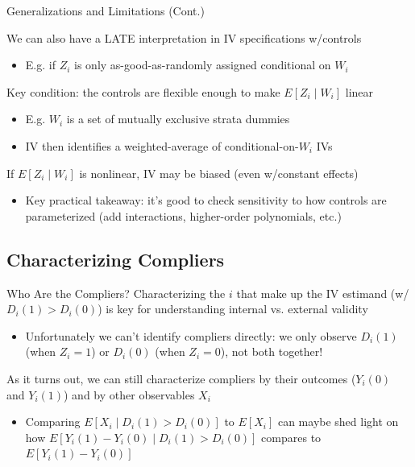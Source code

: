 \documentclass{beamer}
\begin{document}
\begin{frame}{Generalizations and Limitations (Cont.)}

We can also have a LATE interpretation in IV specifications w/controls
\begin{itemize}
\item E.g. if $Z_i$ is only as-good-as-randomly assigned conditional on $W_i$
\end{itemize}\medskip\pause{}

Key condition: the controls are flexible enough to make $E[Z_i\mid W_i]$ linear
\vspace{-0.7cm}
\begin{itemize}
\item E.g. $W_i$ is a set of mutually exclusive strata dummies
\item IV then identifies a weighted-average of conditional-on-$W_i$ IVs
\end{itemize}\medskip\pause{}

If $E[Z_i\mid W_i]$ is nonlinear, IV may be biased (even w/constant effects)
\begin{itemize}
\item Key practical takeaway: it's good to check sensitivity to how controls are parameterized (add interactions, higher-order polynomials, etc.)
\end{itemize}
\end{frame}

\subsection{Characterizing Compliers}

\begin{frame}{Who Are the Compliers?}
Characterizing the $i$ that make up the IV estimand (w/$D_i(1)>D_i(0)$) is key for understanding internal vs. external validity \smallskip
\begin{itemize}
\item Unfortunately we can't identify compliers directly: we only observe $D_i(1)$ (when $Z_i=1$) or $D_i(0)$ (when $Z_i=0$), not both together!
\end{itemize}\bigskip\pause{}
As it turns out, we can still characterize compliers by their outcomes ($Y_i(0)$ and $Y_i(1)$) and by other observables $X_i$\smallskip
\begin{itemize}
\item Comparing $E[X_i\mid D_i(1)>D_i(0)]$ to $E[X_i]$ can maybe shed light on how $E[Y_i(1)-Y_i(0)\mid D_i(1)>D_i(0)]$ compares to $E[Y_i(1)-Y_i(0)]$
\end{itemize}
\end{frame}
\end{document}
